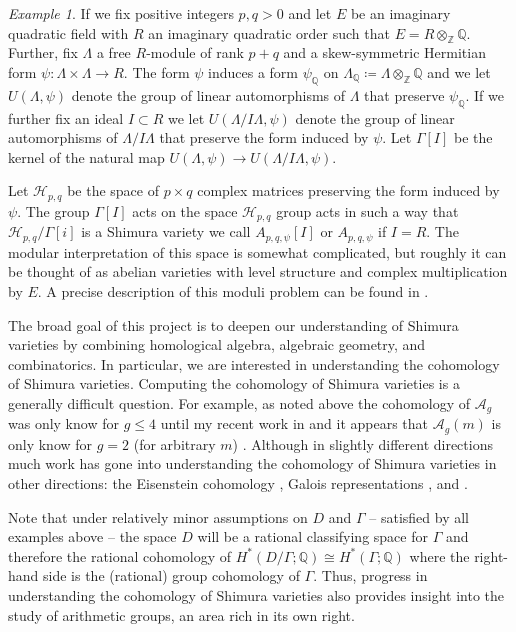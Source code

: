 \documentclass[11pt,reqno]{amsart}
\theoremstyle{remark}
\newtheorem{example}[lemma]{Example}
\newcommand{\QQ}{\mathbb{Q}}
\newcommand{\ZZ}{\mathbb{Z}}
\newcommand{\cA}{\mathcal{A}}
\newcommand{\cH}{\mathcal{H}}
\begin{document}
\begin{example}\label{ex:apq}
If we fix positive integers $p,q>0$ and let $E$ be an imaginary quadratic field with $R$ an imaginary quadratic order such that $E=R\otimes_{\ZZ}\QQ$. Further, fix $\Lambda$ a free $R$-module of rank $p+q$ and a skew-symmetric Hermitian form $\psi:\Lambda\times \Lambda \to R$. The form $\psi$ induces a form $\psi_{\QQ}$ on $\Lambda_{\QQ}\coloneqq \Lambda\otimes_{\ZZ}\QQ$ and we let $U(\Lambda, \psi)$ denote the group of linear automorphisms of $\Lambda$ that preserve $\psi_{\QQ}$. If we further fix an ideal $I\subset R$ we let $U(\Lambda/I\Lambda, \psi)$ denote the group of linear automorphisms of $\Lambda/I\Lambda$ that preserve the form induced by $\psi$. Let $\Gamma[I]$ be the kernel of the natural map $U(\Lambda,\psi)\to U(\Lambda/I\Lambda, \psi)$. 

Let $\cH_{p,q}$ be the space of $p\times q$ complex matrices preserving the form induced by $\psi$. The group $\Gamma[I]$ acts on the space $\cH_{p,q}$ group acts in such a way that $\cH_{p,q}/\Gamma[i]$ is a Shimura variety we call $A_{p,q,\psi}[I]$ or $A_{p,q,\psi}$ if $I=R$. The modular interpretation of this space is somewhat complicated, but roughly it can be thought of as abelian varieties with level structure and complex multiplication by $E$. A precise description of this moduli problem can be found in \cite{RMZ21}.
\end{example}


The broad goal of this project is to deepen our understanding of Shimura varieties by combining homological algebra, algebraic geometry, and combinatorics. In particular, we are interested in understanding the cohomology of Shimura varieties. Computing the cohomology of Shimura varieties is a generally difficult question. For example, as noted above the cohomology of $\cA_{g}$ was only know for $g\leq 4$ \cite{igusa62, hain02, HT12, HT18} until my recent work in \cite{BBCMMW24} and it appears that $\cA_{g}(m)$ is only know for $g=2$  (for arbitrary $m$) \cite{odaSchwermer90}. Although in slightly different  directions much work has gone into understanding the cohomology of Shimura varieties in other directions: the Eisenstein cohomology \cite{harris14, harder90}, Galois representations \cite{scholze15,HLTT16,CG18}, and \cite{harrisZucker,lan17,Lan16}.

Note that under relatively minor assumptions on $D$ and $\Gamma$ -- satisfied by all examples above -- the space $D$ will be a rational classifying space for $\Gamma$ and therefore the rational cohomology of  $H^{*}(D/\Gamma; \QQ)\cong H^{*}(\Gamma; \QQ)$ where the right-hand side is the (rational) group cohomology of $\Gamma$. Thus, progress in understanding the cohomology of Shimura varieties also provides insight into the study of arithmetic groups, an area rich in its own right.
\end{document}
